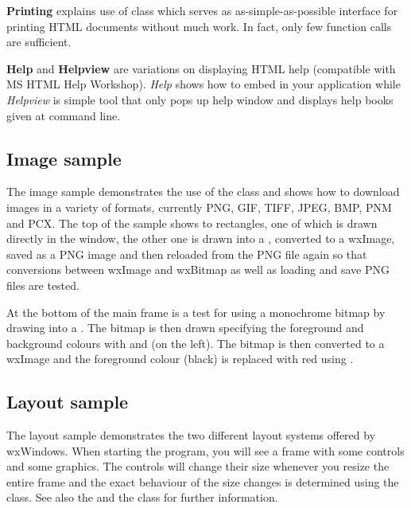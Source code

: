{\bf Printing} explains use of 
class which serves as as-simple-as-possible interface for printing HTML 
documents without much work. In fact, only few function calls are sufficient.

{\bf Help} and {\bf Helpview} are variations on displaying HTML help 
(compatible with MS HTML Help Workshop). {\it Help} shows how to embed
 in your application
while {\it Helpview} is simple tool that only pops up help window and
displays help books given at command line.

\subsection{Image sample}\label{sampleimage}

The image sample demonstrates the use of the  class
and shows how to download images in a variety of formats, currently PNG, GIF,
TIFF, JPEG, BMP, PNM and PCX. The top of the sample shows to rectangles, one
of which is drawn directly in the window, the other one is drawn into a
, converted to a wxImage, saved as a PNG image
and then reloaded from the PNG file again so that conversions between wxImage
and wxBitmap as well as loading and save PNG files are tested.

At the bottom of the main frame is a test for using a monochrome bitmap by
drawing into a . The bitmap is then drawn
specifying the foreground and background colours with 
 and 
 (on the left). The
bitmap is then converted to a wxImage and the foreground colour (black) is
replaced with red using .

\subsection{Layout sample}\label{samplelayout}

The layout sample demonstrates the two different layout systems offered
by wxWindows. When starting the program, you will see a frame with some
controls and some graphics. The controls will change their size whenever
you resize the entire frame and the exact behaviour of the size changes
is determined using the 
class. See also the  and the
class for further information.

